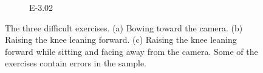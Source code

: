 \begin{figure}
\begin{subfigure}[b]{0.16\linewidth}
      \caption[]{E-3.02}
  \end{subfigure}
  \caption[Difficult Exercises]{The three difficult exercises. (a) Bowing toward the camera. (b) Raising the knee leaning forward. (c) Raising the knee leaning forward while sitting and facing away from the camera. Some of the exercises contain errors in the sample.}
  \label{fig:difficult_exercises}
\end{figure}
